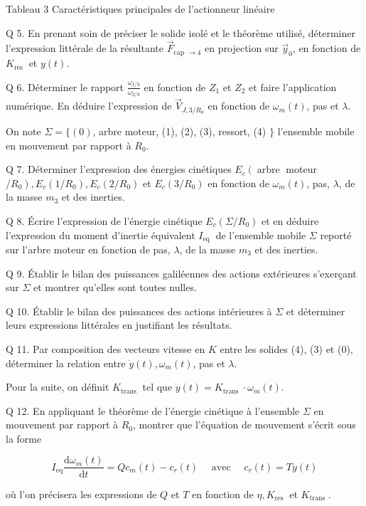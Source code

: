 \documentclass[10pt]{article}
\begin{document}
Tableau 3 Caractéristiques principales de l'actionneur linéaire

Q 5. En prenant soin de préciser le solide isolé et le théorème utilisé, déterminer l'expression littérale de la résultante $\vec{F}_{\text {cap } \rightarrow 4}$ en projection sur $\vec{y}_{0}$, en fonction de $K_{\text {res }}$ et $y(t)$.

Q 6. Déterminer le rapport $\frac{\omega_{1 / 3}}{\omega_{2 / 3}}$ en fonction de $Z_{1}$ et $Z_{2}$ et faire l'application numérique. En déduire l'expression de $\vec{V}_{J, 3 / R_{0}}$ en fonction de $\omega_{m}(t)$, pas et $\lambda$.

On note $\Sigma=\{(0)$, arbre moteur, (1), (2), (3), ressort, (4) $\}$ l'ensemble mobile en mouvement par rapport à $R_{0}$.

Q 7. Déterminer l'expression des énergies cinétiques $E_{c}\left(\operatorname{arbre}\right.$ moteur $\left./ R_{0}\right), E_{c}\left(1 / R_{0}\right), E_{c}\left(2 / R_{0}\right)$ et $E_{c}\left(3 / R_{0}\right)$ en fonction de $\omega_{m}(t)$, pas, $\lambda$, de la masse $m_{3}$ et des inerties.

Q 8. Écrire l'expression de l'énergie cinétique $E_{c}\left(\Sigma / R_{0}\right)$ et en déduire l'expression du moment d'inertie équivalent $I_{\text {eq }}$ de l'ensemble mobile $\Sigma$ reporté sur l'arbre moteur en fonction de pas, $\lambda$, de la masse $m_{3}$ et des inerties.

Q 9. Établir le bilan des puissances galiléennes des actions extérieures s'exerçant sur $\Sigma$ et montrer qu'elles sont toutes nulles.

Q 10. Établir le bilan des puissances des actions intérieures à $\Sigma$ et déterminer leurs expressions littérales en justifiant les résultats.

Q 11. Par composition des vecteurs vitesse en $K$ entre les solides (4), (3) et (0), déterminer la relation entre $\dot{y}(t), \omega_{m}(t)$, pas et $\lambda$.

Pour la suite, on définit $K_{\text {trans }}$ tel que $\dot{y}(t)=K_{\text {trans }} \cdot \omega_{m}(t)$.

Q 12. En appliquant le théorème de l'énergie cinétique à l'ensemble $\Sigma$ en mouvement par rapport à $R_{0}$, montrer que l'équation de mouvement s'écrit sous la forme

$$
I_{\mathrm{eq}} \frac{\mathrm{d} \omega_{m}(t)}{\mathrm{d} t}=Q c_{m}(t)-c_{r}(t) \quad \text { avec } \quad c_{r}(t)=T y(t)
$$

où l'on précisera les expressions de $Q$ et $T$ en fonction de $\eta, K_{\text {res }}$ et $K_{\text {trans }}$.
\end{document}
